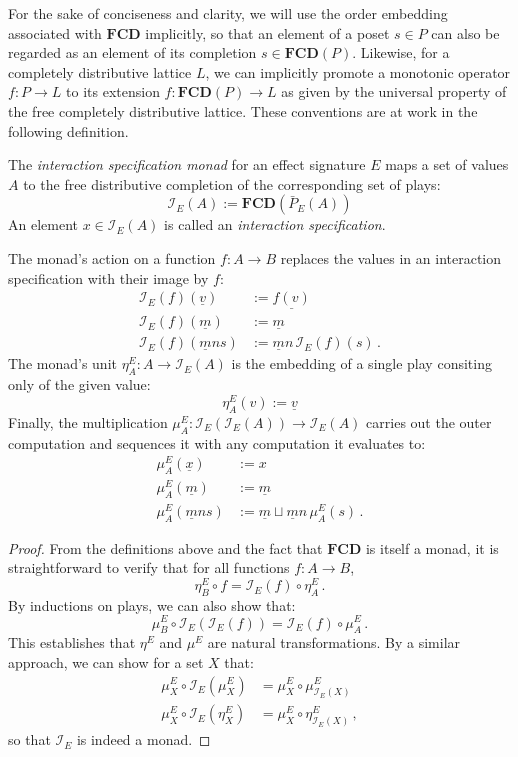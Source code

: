 \documentclass[sigplan,10pt,review,anonymous]{acmart}
\begin{document}
For the sake of conciseness and clarity,
we will use the order embedding associated with $\mathbf{FCD}$
implicitly,
so that an element of a poset $s \in P$
can also be regarded as an element of
its completion $s \in \mathbf{FCD}(P)$.
Likewise,
for a completely distributive lattice $L$,
we can implicitly
promote a monotonic operator
$f : P \rightarrow L$
to its extension
$f : \mathbf{FCD}(P) \rightarrow L$
as given by the universal property of
the free completely distributive lattice.
These conventions are at work
in the following definition.

\begin{definition} \label{def:intm} %
The \emph{interaction specification monad}
for an effect signature $E$
maps a set of values $A$
to the free distributive completion
of the corresponding set of plays:
\[
    \mathcal{I}_E(A) :=
      \mathbf{FCD}(\bar{P}_E(A))
\]
An element $x \in \mathcal{I}_E(A)$ is called
an \emph{interaction specification}.

The monad's action on a function $f : A \rightarrow B$
replaces the values in
an interaction specification with their image by $f$:
\begin{align*}
  \mathcal{I}_E(f)(\underline{v}) &:= \underline{f(v)} \\
  \mathcal{I}_E(f)(\underline{m}) &:= \underline{m} \\
  \mathcal{I}_E(f)(\underline{m} n s) &:=
    \underline{m} n \, \mathcal{I}_E(f)(s) \,.
\end{align*}
The monad's unit
$\eta^E_A : A \rightarrow \mathcal{I}_E(A)$
is the embedding of a single play
consiting only of the given value:
\[
    \eta^E_A(v) := \underline{v}
\]
Finally, the multiplication
$\mu^E_A : \mathcal{I}_E(\mathcal{I}_E(A)) \rightarrow \mathcal{I}_E(A)$
carries out the outer computation and
sequences it with any computation it evaluates to:
\begin{align*}
  \mu^E_A(\underline{x}) &:= x \\
  \mu^E_A(\underline{m}) &:= \underline{m} \\
  \mu^E_A(\underline{m} n s) &:=
    \underline{m} \sqcup \underline{m} n \, \mu^E_A(s) \,.
\end{align*}

\begin{proof} %
From the definitions above and
the fact that $\mathbf{FCD}$ is itself a monad,
it is straightforward to verify that
for all functions $f : A \rightarrow B$,
\[
    \eta^E_B \circ f = \mathcal{I}_E(f) \circ \eta^E_A \,.
\]
By inductions on plays, we can also show that:
\[
    \mu^E_B \circ \mathcal{I}_E(\mathcal{I}_E(f)) =
      \mathcal{I}_E(f) \circ \mu^E_A \,.
\]
This establishes that $\eta^E$ and $\mu^E$
are natural transformations.
By a similar approach,
we can show for a set $X$ that:
\begin{align*}
  \mu^E_X \circ \mathcal{I}_E(\mu^E_X) &=
    \mu^E_X \circ \mu^E_{\mathcal{I}_E(X)} \\
  \mu^E_X \circ \mathcal{I}_E(\eta^E_X) &=
    \mu^E_X \circ \eta^E_{\mathcal{I}_E(X)} \,,
\end{align*}
so that $\mathcal{I}_E$ is indeed a monad.
\end{proof}
\end{definition}
\end{document}
